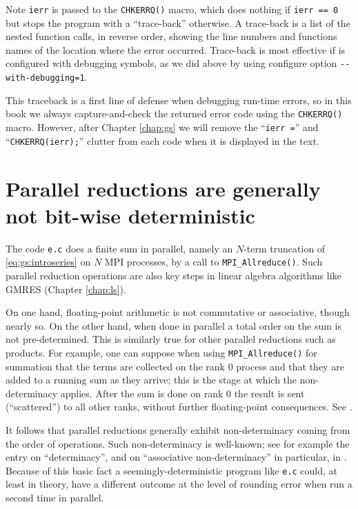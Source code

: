 Note \texttt{ierr} is passed to the \texttt{CHKERRQ()} macro, which does nothing if \texttt{ierr == 0} but stops the program with a ``trace-back'' otherwise.  A trace-back is a list of the nested function calls, in reverse order, showing the line numbers and functions names of the location where the error occurred.  Trace-back is most effective if \PETSc is configured with debugging symbols, as we did above by using configure option \verb|--with-debugging=1|.

This traceback is a first line of defense when debugging run-time errors, so in this book we always capture-and-check the returned error code using the \texttt{CHKERRQ()} macro.  However, after Chapter \ref{chap:gs} we will remove the ``\texttt{ierr =}'' and ``\texttt{CHKERRQ(ierr);}'' clutter from each code when it is displayed in the text.


\section{Parallel reductions are generally not bit-wise deterministic}

The code \texttt{e.c} does a finite sum in parallel, namely an $N$-term truncation of \eqref{eq:gs:introseries} on $N$ MPI processes, by a call to \texttt{MPI\_Allreduce()}.  Such parallel reduction operations are also key steps in linear algebra algorithms like GMRES (Chapter \ref{chap:ls}).

On one hand, floating-point arithmetic is not commutative or associative, though nearly so.  On the other hand, when done in parallel a total order on the sum is not pre-determined.  This is similarly true for other parallel reductions such as products.  For example, one can suppose when using \texttt{MPI\_Allreduce()} for summation that the terms are collected on the rank $0$ process and that they are added to a running sum as they arrive; this is the stage at which the non-determinacy applies.  After the sum is done on rank $0$ the result is sent (``scattered'') to all other ranks, without further floating-point consequences.  See \citep{Groppetal1999}.

It follows that parallel reductions generally exhibit non-determinacy coming from the order of operations.  Such non-determinacy is well-known; see for example the entry on ``determinacy'', and on ``associative non-determinacy'' in particular, in \citep{Padua2011}.  Because of this basic fact a seemingly-deterministic program like \texttt{e.c} could, at least in theory, have a different outcome at the level of rounding error when run a second time in parallel.

